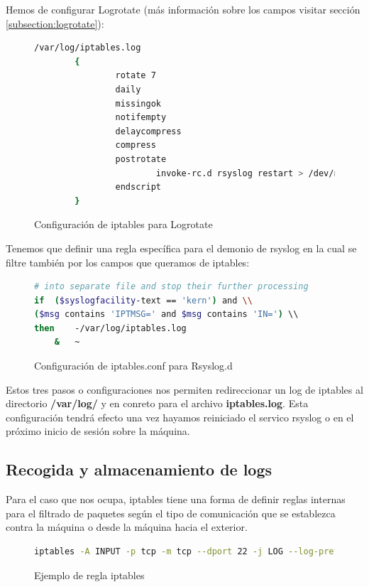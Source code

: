 \pagebreak
\begin{minipage}{\linewidth}
Hemos de configurar Logrotate (más información sobre los campos visitar sección \ref{subsection:logrotate}):

\begin{figure}[H]
\begin{lstlisting}[language=bash]
/var/log/iptables.log
        {
                rotate 7
                daily
                missingok
                notifempty
                delaycompress
                compress
                postrotate
                        invoke-rc.d rsyslog restart > /dev/null
                endscript
        }
\end{lstlisting}
\caption{Configuración de iptables para Logrotate}
\end{figure}

Tenemos que definir una regla específica para el demonio de rsyslog en la cual se filtre también por los campos que queramos de iptables:

\begin{figure}[H]
\begin{lstlisting}[language=bash]
# into separate file and stop their further processing
if  ($syslogfacility-text == 'kern') and \\
($msg contains 'IPTMSG=' and $msg contains 'IN=') \\
then    -/var/log/iptables.log
    &   ~

\end{lstlisting}
\caption{Configuración de iptables.conf para Rsyslog.d}
\end{figure}

Estos tres pasos o configuraciones nos permiten redireccionar un log de iptables al directorio \textbf{/var/log/} y en conreto para el archivo \textbf{iptables.log}. Esta configuración tendrá efecto una vez hayamos reiniciado el servico rsyslog o en el próximo inicio de sesión sobre la máquina.

\pagebreak
\subsection[Logs]{Recogida y almacenamiento de logs}
Para el caso que nos ocupa, iptables tiene una forma de definir reglas internas para el filtrado de paquetes según el tipo de comunicación que se establezca contra la máquina o desde la máquina hacia el exterior.

\begin{figure}[H]
\begin{lstlisting}[language=bash]
iptables -A INPUT -p tcp -m tcp --dport 22 -j LOG --log-prefix "IPTMSG=Connection SSH "
\end{lstlisting}
\caption{Ejemplo de regla iptables}
\end{figure}


\end{minipage}
